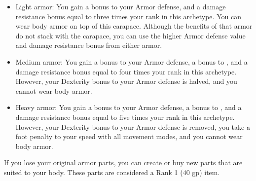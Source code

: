         \begin{itemize}
            \item Light armor: You gain a  bonus to your Armor defense, and a damage resistance bonus equal to three times your rank in this archetype.
                You can wear body armor on top of this carapace.
                Although the benefits of that armor do not stack with the carapace, you can use the higher Armor defense value and damage resistance bonus from either armor.
            \item Medium armor: You gain a  bonus to your Armor defense, a  bonus to , and a damage resistance bonus equal to four times your rank in this archetype.
                However, your Dexterity bonus to your Armor defense is halved, and you cannot wear body armor.
            \item Heavy armor: You gain a  bonus to your Armor defense, a  bonus to , and a damage resistance bonus equal to five times your rank in this archetype.
                However, your Dexterity bonus to your Armor defense is removed, you take a  foot penalty to your speed with all movement modes, and you cannot wear body armor.
        \end{itemize}

        If you lose your original armor parts, you can create or buy new parts that are suited to your body.
        These parts are considered a Rank 1 (40 gp) item.

